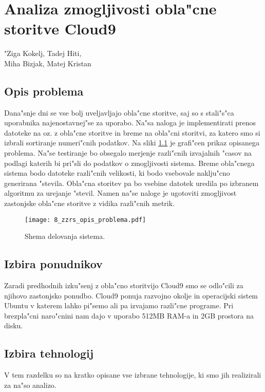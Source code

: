 \chapter[Analiza zmogljivosti obla"cne storitve c9]{Analiza zmogljivosti obla"cne storitve Cloud9}

\pagestyle{fancy}
\fancyhf{}
\fancyhead[LE,RO]{\thepage}
\fancyhead[RE,LO]{\leftmark}

\huge "Ziga Kokelj, Tadej Hiti,\\Miha Bizjak, Matej Kristan
\normalsize
\bigskip

\section{Opis problema} \label{8_opis_problema}
\noindent Dana"snje dni se vse bolj uveljavljajo obla"cne storitve, saj so s stali"s"ca uporabnika najenostavnej"se za uporabo. Na"sa naloga je implementirati prenos datoteke na oz. z obla"cne storitve in breme na obla"cni storitvi, za katero smo si izbrali sortiranje numeri"cnih podatkov.
\noindent Na sliki \ref{8_opis_problema} je grafi"cen prikaz opisanega problema.
\noindent Na"se testiranje bo obsegalo merjenje razli"cnih izvajalnih "casov na podlagi katerih bi pri"sli do podatkov o zmogljivosti sistema. Breme obla"cnega sistema bodo datoteke razli"cnih velikosti, ki bodo vsebovale naklju"cno generirana "stevila. Obla"cna storitev pa bo vsebine datotek uredila po izbranem algoritmu za urejanje "stevil.  
Namen na"se naloge je ugotoviti zmogljivost zastonjske obla"cne storitve z vidika razli"cnih metrik. 

\begin{figure}
  \centering
    \texttt{[image: 8\_zzrs\_opis\_problema.pdf]}
  \caption{Shema delovanja sistema.}
  \label{8_opis_problema}
\end{figure}


\section{Izbira ponudnikov}
Zaradi predhodnih izku"senj z obla"cno storitvijo Cloud9 smo se odlo"cili za njihovo zastonjsko ponudbo. Cloud9 ponuja razvojno okolje in operacijski sistem Ubuntu v katerem lahko pi"semo ali pa izvajamo razli"cne programe.  Pri brezpla"cni naro"cnini nam dajo v uporabo 512MB RAM-a in 2GB prostora na disku.


\section{Izbira tehnologij}
V tem razdelku so na kratko opisane vse izbrane tehnologije, ki smo jih realizirali za na"so analizo.

